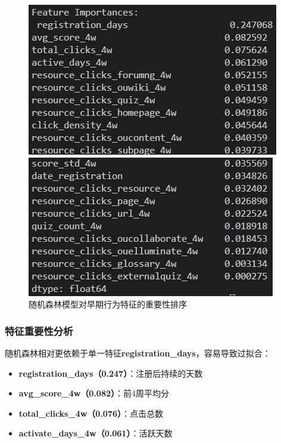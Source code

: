 \documentclass{SYSUReport}
\begin{document}
\begin{figure}[htbp]
    \centering
    \begin{minipage}[b]{0.48\textwidth}
        \centering
        \includegraphics[width=\linewidth]{figures/rf_features1.png}
    \end{minipage}
    \hfill
    \begin{minipage}[b]{0.48\textwidth}
        \centering
        \includegraphics[width=\linewidth]{figures/rf_features2.png}
    \end{minipage}
    \caption{随机森林模型对早期行为特征的重要性排序}
    \label{fig:rf_feature_importance}
\end{figure}

\subsubsection{特征重要性分析}
随机森林相对更依赖于单一特征\textbf{registration\_days}，容易导致过拟合：
\begin{itemize}
    \item \textbf{registration\_days（0.247）}：注册后持续的天数
    \item \textbf{avg\_score\_4w（0.082）}：前4周平均分
    \item \textbf{total\_clicks\_4w（0.076）}：点击总数
    \item \textbf{activate\_days\_4w（0.061）}：活跃天数
\end{itemize}
\end{document}
